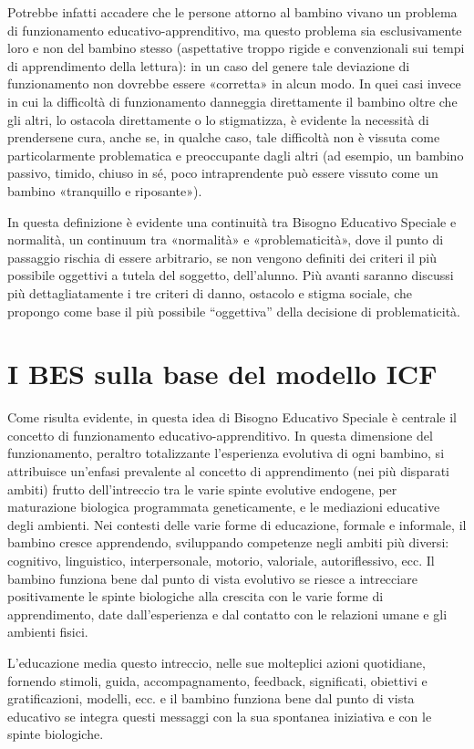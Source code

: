 Potrebbe infatti accadere che le persone attorno al bambino vivano un problema di
funzionamento educativo-apprenditivo, ma questo problema sia esclusivamente loro e non del
bambino stesso (aspettative troppo rigide e convenzionali sui tempi di apprendimento della
lettura): in un caso del genere tale deviazione di funzionamento non dovrebbe essere «corretta» in
alcun modo. In quei casi invece in cui la difficoltà di funzionamento danneggia direttamente il
bambino oltre che gli altri, lo ostacola direttamente o lo stigmatizza, è evidente la necessità di
prendersene cura, anche se, in qualche caso, tale difficoltà non è vissuta come particolarmente
problematica e preoccupante dagli altri (ad esempio, un bambino passivo, timido, chiuso in sé,
poco intraprendente può essere vissuto come un bambino «tranquillo e riposante»).

In questa definizione è evidente una continuità tra Bisogno Educativo Speciale e normalità, un
continuum tra «normalità» e «problematicità», dove il punto di passaggio rischia di essere
arbitrario, se non vengono definiti dei criteri il più possibile oggettivi a tutela del soggetto,
dell'alunno. Più avanti saranno discussi più dettagliatamente i tre criteri di danno, ostacolo e
stigma sociale, che propongo come base il più possibile “oggettiva” della decisione di
problematicità.
\section*{I BES sulla base del modello ICF}
Come risulta evidente, in questa idea di Bisogno Educativo Speciale è centrale il concetto di
funzionamento educativo-apprenditivo. In questa dimensione del funzionamento, peraltro
totalizzante l'esperienza evolutiva di ogni bambino, si attribuisce un'enfasi prevalente al concetto di
apprendimento (nei più disparati ambiti) frutto dell'intreccio tra le varie spinte evolutive
endogene, per maturazione biologica programmata geneticamente, e le mediazioni educative degli
ambienti. Nei contesti delle varie forme di educazione, formale e informale, il bambino cresce
apprendendo, sviluppando competenze negli ambiti più diversi: cognitivo, linguistico,
interpersonale, motorio, valoriale, autoriflessivo, ecc. Il bambino funziona bene dal punto di vista
evolutivo se riesce a intrecciare positivamente le spinte biologiche alla crescita con le varie forme
di apprendimento, date dall'esperienza e dal contatto con le relazioni umane e gli ambienti fisici.

L'educazione media questo intreccio, nelle sue molteplici azioni quotidiane, fornendo stimoli,
guida, accompagnamento, feedback, significati, obiettivi e gratificazioni, modelli, ecc. e il bambino
funziona bene dal punto di vista educativo se integra questi messaggi con la sua spontanea
iniziativa e con le spinte biologiche.

